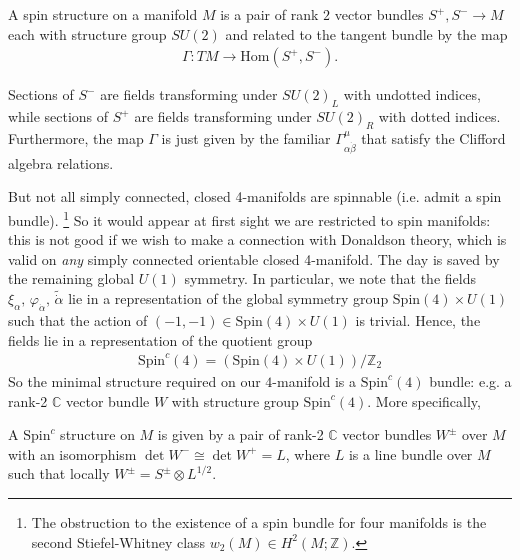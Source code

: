 \documentclass[12pt, onecolumn]{article}
\newenvironment{definition}[1][Definition]{\begin{trivlist}
\item[\hskip \labelsep {\bfseries #1}]}{\end{trivlist}}
\newenvironment{remark}[1][Remark]{\begin{trivlist}
\item[\hskip \labelsep {\bfseries #1}]}{\end{trivlist}}
\begin{document}
\begin{definition}
A spin structure on a manifold $M$ is a pair of rank $2$ vector bundles $S^{+},S^{-} \rightarrow M$ each with structure group $SU(2)$ and related to the tangent bundle by the map
\begin{align*}
\Gamma: TM \rightarrow \text{Hom}\left(S^{+},S^{-}\right).
\end{align*}
\end{definition}

\begin{remark}
Sections of $S^{-}$ are fields transforming under $SU(2)_{L}$ with undotted indices, while sections of $S^{+}$ are fields transforming under $SU(2)_{R}$ with dotted indices.  Furthermore, the map $\Gamma$ is just given by the familiar $\Gamma^{\mu}_{\alpha \dot{\beta}}$ that satisfy the Clifford algebra relations.
\end{remark}

\noindent But not all simply connected, closed 4-manifolds are spinnable (i.e. admit a spin bundle). \footnote{The obstruction to the existence of a spin bundle for four manifolds is the second Stiefel-Whitney class $w_{2}(M) \in H^2(M;\mathbb{Z})$.}  So it would appear at first sight we are restricted to spin manifolds: this is not good if we wish to make a connection with Donaldson theory, which is valid on \textit{any} simply connected orientable closed 4-manifold.  The day is saved by the remaining global $U(1)$ symmetry.  In particular, we note that the fields $\xi_{\alpha},\,\varphi_{\dot{\alpha}},\,\widetilde{\dot{\alpha}}$ lie in a representation of the global symmetry group $\text{Spin}(4) \times U(1)$ such that the action of $(-1,-1) \in \text{Spin}(4) \times U(1)$ is trivial.  Hence, the fields lie in a representation of the quotient group
\begin{align*}
\text{Spin}^{c}(4) = (\text{Spin}(4) \times U(1))/\mathbb{Z}_{2}
\end{align*}
So the minimal structure required on our $4$-manifold is a $\text{Spin}^{c}(4)$ bundle: e.g. a rank-2 $\mathbb{C}$ vector bundle $W$ with structure group $\text{Spin}^{c}(4)$.  More specifically,

\begin{definition}
A $\text{Spin}^{c}$ structure on $M$ is given by a pair of rank-2 $\mathbb{C}$ vector bundles $W^{\pm}$ over $M$ with an isomorphism $\det W^{-} \cong \det W^{+}=L$, where $L$ is a line bundle over $M$ such that locally $W^{\pm}=S^{\pm} \otimes L^{1/2}$.
\end{definition}
\end{document}
